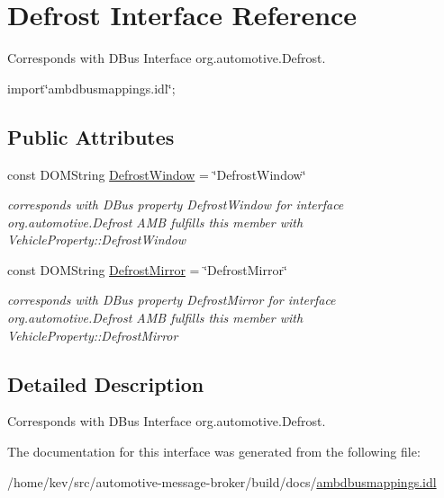\hypertarget{interfaceDefrost}{\section{Defrost Interface Reference}
\label{interfaceDefrost}
}


Corresponds with D\+Bus Interface org.\+automotive.\+Defrost.  




{\ttfamily import\char`\"{}ambdbusmappings.\+idl\char`\"{};}

\subsection*{Public Attributes}
\begin{DoxyCompactItemize}
\item 
\hypertarget{interfaceDefrost_a93685913fb911c4acf5b7a9d1a5c438b}{const D\+O\+M\+String \hyperlink{interfaceDefrost_a93685913fb911c4acf5b7a9d1a5c438b}{Defrost\+Window} = \char`\"{}Defrost\+Window\char`\"{}}\label{interfaceDefrost_a93685913fb911c4acf5b7a9d1a5c438b}

\begin{DoxyCompactList}\small\item\em corresponds with D\+Bus property Defrost\+Window for interface org.\+automotive.\+Defrost A\+M\+B fulfills this member with Vehicle\+Property\+::\+Defrost\+Window \end{DoxyCompactList}\item 
\hypertarget{interfaceDefrost_ab36b984c67951c8bf418dde8bfbd1c69}{const D\+O\+M\+String \hyperlink{interfaceDefrost_ab36b984c67951c8bf418dde8bfbd1c69}{Defrost\+Mirror} = \char`\"{}Defrost\+Mirror\char`\"{}}\label{interfaceDefrost_ab36b984c67951c8bf418dde8bfbd1c69}

\begin{DoxyCompactList}\small\item\em corresponds with D\+Bus property Defrost\+Mirror for interface org.\+automotive.\+Defrost A\+M\+B fulfills this member with Vehicle\+Property\+::\+Defrost\+Mirror \end{DoxyCompactList}\end{DoxyCompactItemize}


\subsection{Detailed Description}
Corresponds with D\+Bus Interface org.\+automotive.\+Defrost. 

The documentation for this interface was generated from the following file\+:\begin{DoxyCompactItemize}
\item 
/home/kev/src/automotive-\/message-\/broker/build/docs/\hyperlink{ambdbusmappings_8idl}{ambdbusmappings.\+idl}\end{DoxyCompactItemize}
